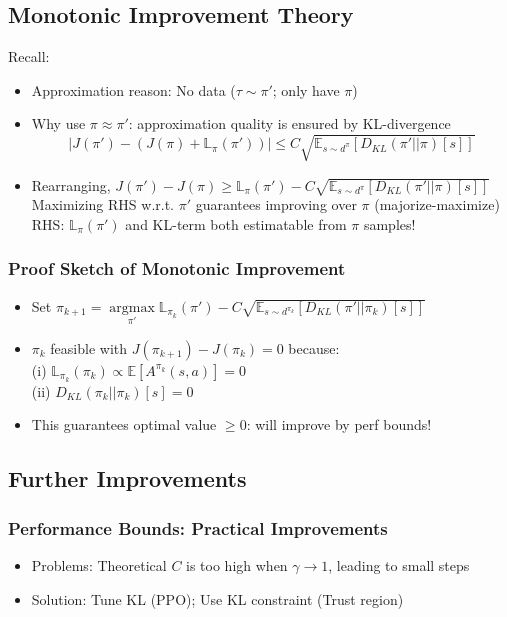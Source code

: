 \documentclass{article}
\begin{document}
\subsection{Monotonic Improvement Theory}
Recall:
\begin{itemize}
\item Approximation reason: No data ($\tau \sim \pi'$; only have $\pi$)
\item Why use $\pi \approx \pi'$: approximation quality is ensured by KL-divergence
    \begin{equation*}
        |J(\pi') - \left( J(\pi) + \mathbb{L}_{\pi}(\pi') \right)| \leq C \sqrt{\mathbb{E}_{s \sim d^{\pi}} \left[ D_{KL} (\pi' || \pi) [s] \right]}
    \end{equation*}
\item Rearranging, $J(\pi') - J(\pi) \geq \mathbb{L}_{\pi}(\pi') - C \sqrt{\mathbb{E}_{s \sim d^{\pi}} \left[ D_{KL} (\pi' || \pi) [s] \right]}$
    \\Maximizing RHS w.r.t. $\pi'$ guarantees improving over $\pi$ (majorize-maximize)
    \\RHS: $\mathbb{L}_{\pi}(\pi')$ and KL-term both estimatable from $\pi$ samples!
\end{itemize}

\begin{prfbox}
    \subsubsection*{Proof Sketch of Monotonic Improvement}
    \begin{itemize}
    \item Set $\pi_{k+1} = \mathop{\arg\max}\limits_{\pi'} \mathbb{L}_{\pi_k} (\pi') - C \sqrt{\mathbb{E}_{s \sim d^{\pi_k}} \left[ D_{KL} (\pi' || \pi_k) [s] \right]}$
    \item $\pi_k$ feasible with $J(\pi_{k+1}) - J(\pi_{k}) = 0$ because:
        \\(i) $\mathbb{L}_{\pi_k} (\pi_k) \propto \mathbb{E} \left[ A^{\pi_{k}} (s, a)\right] = 0$
        \\(ii) $D_{KL} (\pi_k || \pi_k) [s] = 0$
    \item This guarantees optimal value $\geq 0$: will improve by perf bounds!
    \end{itemize}
\end{prfbox}

\subsection{Further Improvements}
\begin{thmbox}
    \subsubsection*{Performance Bounds: Practical Improvements}
    \begin{itemize}
    \item Problems: Theoretical $C$ is too high when $\gamma \to 1$, leading to small steps
    \item Solution: Tune KL (PPO); Use KL constraint (Trust region)
    \end{itemize}
\end{thmbox}
\end{document}
